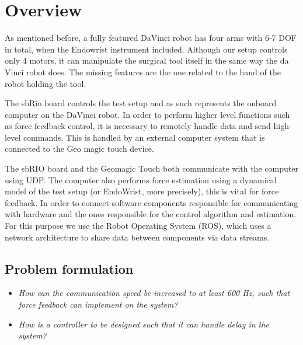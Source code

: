 \section{Overview}
As mentioned before, a fully featured DaVinci robot has four arms with 6-7 \gls{DOF} in total, when the Endowrist instrument included.
Although our setup controls only 4 motors, it can manipulate the surgical tool itself in the same way the da Vinci robot does. The missing features are the one related to the hand of the robot holding the tool.

The sbRio board controls the test setup and as such represents the onboard computer on the DaVinci robot.
In order to perform higher level functions such as force feedback control, it is necessary to remotely handle data and send high-level commands.
This is handled by an external computer system that is connected to the Geo magic touch device.

The sbRIO board and the Geomagic Touch both communicate with the computer using UDP.
The computer also performs force estimation using a dynamical model of the test setup (or EndoWrist, more precisely), this is vital for force feedback.
In order to connect software components responsible for communicating with hardware and the ones responsible for the control algorithm and estimation.
For this purpose we use the Robot Operating System (ROS), which uses a network architecture to share data between components via data streams.



\subsection*{Problem formulation}
\begin{itemize}
\item \textit{How can the communication speed be increased to at least 600 Hz, such that force feedback can implement on the system?}
\item \textit{How is a controller to be designed such that it can handle delay in the system?}
\end{itemize}
